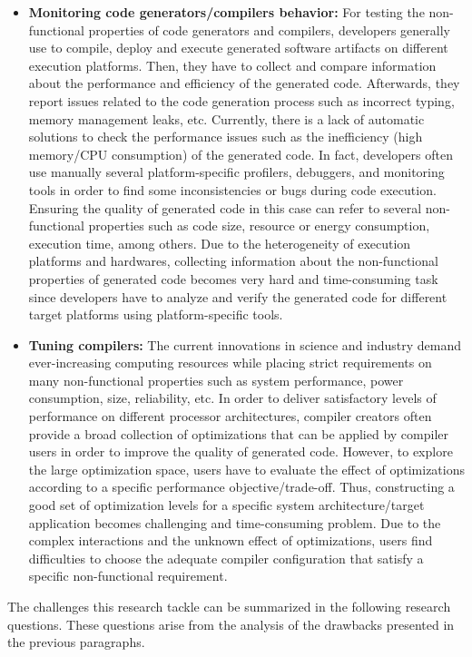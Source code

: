 \begin{itemize}
\item
\textbf{Monitoring code generators/compilers behavior:} For testing the non-functional properties of code generators and compilers, developers generally use to compile, deploy and execute generated software artifacts on different execution platforms. Then, they have to collect and compare information about the performance and efficiency of the generated code. Afterwards, they report issues related to the code generation process such as incorrect typing, memory management leaks, etc.
Currently, there is a lack of automatic solutions to check the performance issues such as the inefficiency (high memory/CPU consumption) of the generated code. In fact, developers often use manually several platform-specific profilers, debuggers, and monitoring tools\cite{guana2014chaintracker,delgado2004taxonomy} in order to find some inconsistencies or bugs during code execution. Ensuring the quality of generated code in this case can refer to several non-functional properties such as code size, resource or energy consumption, execution time, among others\cite{pan2006fast}. Due to the heterogeneity of execution platforms and hardwares, collecting information about the non-functional properties of generated code becomes very hard and time-consuming task since developers have to analyze and verify the generated code for different target platforms using platform-specific tools. 
\item
\textbf{Tuning compilers:} The current innovations in science and industry demand ever-increasing computing resources while placing strict requirements on many non-functional properties such as system performance, power consumption, size, reliability, etc. In order to deliver satisfactory levels of performance on different processor architectures, compiler creators often provide a broad collection of optimizations that can be applied by compiler users in order to improve the quality of generated code. However, to explore the large optimization space, users have to evaluate the effect of optimizations according to a specific performance objective/trade-off. Thus, constructing a good set of optimization levels for a specific system architecture/target application becomes challenging and time-consuming problem. Due to the complex interactions and the unknown effect of optimizations, users find difficulties to choose the adequate compiler configuration that satisfy a specific non-functional requirement.





 


\end{itemize}
The challenges this research tackle can be summarized in the following research questions. These questions arise from the analysis of the drawbacks presented in the previous paragraphs.

